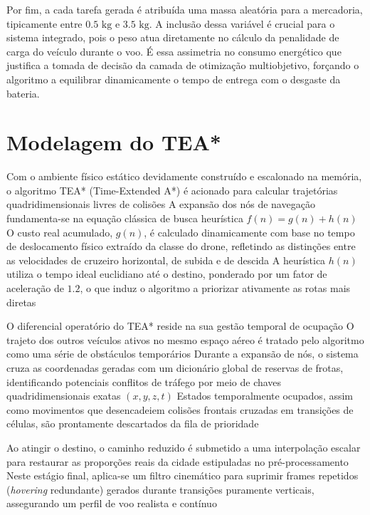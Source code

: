 Por fim, a cada tarefa gerada é atribuída uma massa aleatória para a mercadoria, tipicamente entre $0.5\text{ kg}$ e $3.5\text{ kg}$. A inclusão dessa variável é crucial para o sistema integrado, pois o peso atua diretamente no cálculo da penalidade de carga do veículo durante o voo. É essa assimetria no consumo energético que justifica a tomada de decisão da camada de otimização multiobjetivo, forçando o algoritmo a equilibrar dinamicamente o tempo de entrega com o desgaste da bateria.

\section{Modelagem do TEA*}\label{sec:dev-tea}

Com o ambiente físico estático devidamente construído e escalonado na memória, o algoritmo TEA* (Time-Extended A*) é acionado para calcular trajetórias quadridimensionais livres de colisões %
A expansão dos nós de navegação fundamenta-se na equação clássica de busca heurística $f(n) = g(n) + h(n)$ %
O custo real acumulado, $g(n)$, é calculado dinamicamente com base no tempo de deslocamento físico extraído da classe do drone, refletindo as distinções entre as velocidades de cruzeiro horizontal, de subida e de descida %
A heurística $h(n)$ utiliza o tempo ideal euclidiano até o destino, ponderado por um fator de aceleração de $1.2$, o que induz o algoritmo a priorizar ativamente as rotas mais diretas %

O diferencial operatório do TEA* reside na sua gestão temporal de ocupação %
O trajeto dos outros veículos ativos no mesmo espaço aéreo é tratado pelo algoritmo como uma série de obstáculos temporários %
Durante a expansão de nós, o sistema cruza as coordenadas geradas com um dicionário global de reservas de frotas, identificando potenciais conflitos de tráfego por meio de chaves quadridimensionais exatas $(x, y, z, t)$ %
Estados temporalmente ocupados, assim como movimentos que desencadeiem colisões frontais cruzadas em transições de células, são prontamente descartados da fila de prioridade %

Ao atingir o destino, o caminho reduzido é submetido a uma interpolação escalar para restaurar as proporções reais da cidade estipuladas no pré-processamento %
Neste estágio final, aplica-se um filtro cinemático para suprimir frames repetidos (\textit{hovering} redundante) gerados durante transições puramente verticais, assegurando um perfil de voo realista e contínuo %

